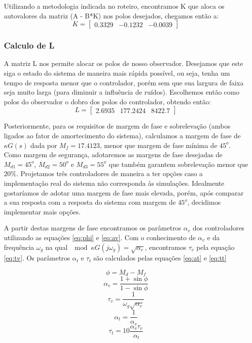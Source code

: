 \documentclass{article}
\begin{document}
Utilizando a metodologia indicada no roteiro\cite{bb:roteiro}, encontramos K que aloca os autovalores da matriz (A - B*K) nos polos desejados, chegamos então a: 
\begin{equation}
\label{eq:matk}
K=
\begin{bmatrix}
0.3329 & -0.1232 & -0.0039
\end{bmatrix}
\end{equation}

\subsubsection{Calculo de L}
A matriz L nos permite alocar os polos de nosso observador. Desejamos que este siga o estado do sistema de maneira mais rápida possível, ou seja, tenha um tempo de resposta menor que o controlador, porém sem que sua largura de faixa seja muito larga (para diminuir a influência de ruídos). Escolhemos então como polos do observador o dobro dos polos do controlador, obtendo então:
\begin{equation}
\label{eq:matl}
L=
\begin{bmatrix}
2.6935 & 177.2424 & 8422.7
\end{bmatrix}
\end{equation}

Posteriormente, para os requisitos de margem de fase e sobrelevação (ambos ligados ao fator de amortecimento do sistema), calculamos a margem de fase de $\kappa G(s)$ dada por $M_f=17.4123$, menor que margem de fase mínima de $45^o$. Como margem de segurança, adotaremos as margens de fase desejadas de $M_{d1}=45^o$, $M_{d2}=50^o$ e $M_{d3}=55^o$ que também garantem sobrelevação menor que $20\%$. Projetamos três controladores de maneira a ter opções caso a implementação real do sistema não corresponda às simulações. Idealmente gostaríamos de adotar uma margem de fase mais elevada, porém, após comparar a sua resposta com a resposta do sistema com margem de $45^o$, decidimos implementar mais opções.

A partir destas margens de fase encontramos os parâmetros $\alpha_v$ dos controladores utilizando as equações \ref{eq:phi} e \ref{eq:av}. Com o conhecimento de $\alpha_v$ e da frequência $\omega_g$ na qual $\mod{\kappa G(j\omega_g)}=\sqrt{\alpha_v}$, encontramos $\tau_v$ pela equação \ref{eq:tv}. Os parâmetros $\alpha_t$ e $\tau_t$ são calculados pelas equações \ref{eq:at} e \ref{eq:tt}

\begin{equation}
\label{eq:phi}
\phi=M_d-M_f
\end{equation}
\begin{equation}
	\label{eq:av}
	\alpha_v=\frac{1+\sin{\phi}}{1-\sin{\phi}}
\end{equation}
\begin{equation}
	\label{eq:tv}
	\tau_v=\frac{1}{\omega_g \sqrt{\alpha_v}}
\end{equation}
\begin{equation}
\label{eq:at}
\alpha_t=\frac{1}{\alpha_v}
\end{equation}
\begin{equation}
\label{eq:tt}
\tau_t=10\frac{\alpha_v \tau_v}{\alpha_t}
\end{equation}
\end{document}

